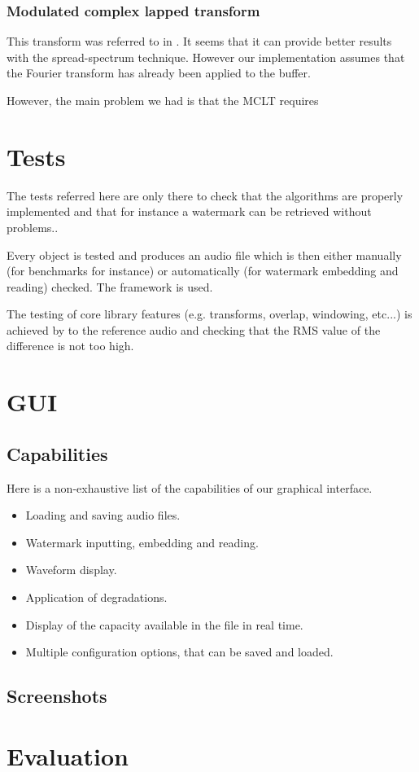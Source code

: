 \subsubsection{Modulated complex lapped transform}
This transform was referred to in \cite{malvar1999modulated}. It seems that it can provide better results with the spread-spectrum technique. However our implementation assumes that the Fourier transform has already been applied to the buffer.

However, the main problem we had is that the MCLT requires 

\section{Tests}
The tests referred here are only there to check that the algorithms are properly implemented and that for instance a watermark can be retrieved without problems..

Every object is tested and produces an audio file which is then either manually (for benchmarks for instance) or automatically (for watermark embedding and reading) checked. The  framework is used.

The testing of core library features (e.g. transforms, overlap, windowing, etc...) is achieved by  to the reference audio and checking that the RMS value of the difference is not too high.
\section{GUI}
\subsection{Capabilities}
Here is a non-exhaustive list of the capabilities of our graphical interface.
\begin{itemize}
\item Loading and saving audio files.
\item Watermark inputting, embedding and reading.
\item Waveform display.
\item Application of degradations.
\item Display of the capacity available in the file in real time.
\item Multiple configuration options, that can be saved and loaded.
\end{itemize}
\subsection{Screenshots}
\section{Evaluation}